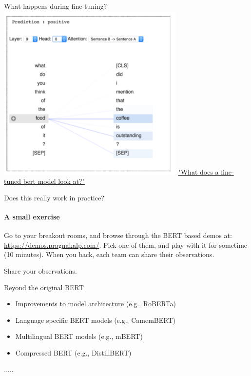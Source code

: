 \documentclass{beamer}
\begin{document}
\begin{frame}{What happens during fine-tuning?}
    \includegraphics[width=0.7\textwidth]{figures/aspect3.png}
    \href{https://towardsdatascience.com/what-does-a-fine-tuned-bert-model-look-at-2eb39b6868dd}{"What does a fine-tuned bert model look at?"}
\end{frame}

\begin{frame}{Does this really work in practice?}
\framesubtitle{A small exercise}
    Go to your breakout rooms, and browse through the BERT based demos at: \url{https://demos.pragnakalp.com/}. Pick one of them, and play with it for sometime (10 minutes). When you back, each team can share their observations.
\end{frame}

\begin{frame}{}
    Share your observations. 
\end{frame}

\begin{frame}{Beyond the original BERT}
\begin{itemize}
    \item Improvements to model architecture  (e.g., RoBERTa)
    \item Language specific BERT models (e.g., CamemBERT)
    \item Multilingual BERT models (e.g., mBERT)
    \item Compressed BERT (e.g., DistillBERT)
\end{itemize}
..... 
\end{frame}
\end{document}
